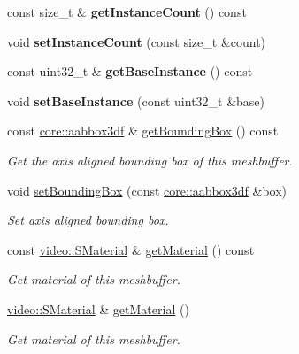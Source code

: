 \begin{DoxyCompactItemize}
\item 
const size\+\_\+t \& {\bfseries get\+Instance\+Count} () const \hypertarget{classirr_1_1scene_1_1IMeshBuffer_ac13655bb7c91e4917c8ed74ba7241414}{}\label{classirr_1_1scene_1_1IMeshBuffer_ac13655bb7c91e4917c8ed74ba7241414}

\item 
void {\bfseries set\+Instance\+Count} (const size\+\_\+t \&count)\hypertarget{classirr_1_1scene_1_1IMeshBuffer_a8358b00737428ad08be25c97188bec65}{}\label{classirr_1_1scene_1_1IMeshBuffer_a8358b00737428ad08be25c97188bec65}

\item 
const uint32\+\_\+t \& {\bfseries get\+Base\+Instance} () const \hypertarget{classirr_1_1scene_1_1IMeshBuffer_a9fea491c3617ce1a4ac0f24a5b0ac8bf}{}\label{classirr_1_1scene_1_1IMeshBuffer_a9fea491c3617ce1a4ac0f24a5b0ac8bf}

\item 
void {\bfseries set\+Base\+Instance} (const uint32\+\_\+t \&base)\hypertarget{classirr_1_1scene_1_1IMeshBuffer_a621584bc5b4a3f7c703a696272441b0a}{}\label{classirr_1_1scene_1_1IMeshBuffer_a621584bc5b4a3f7c703a696272441b0a}

\item 
const \hyperlink{namespaceirr_1_1core_adfc8fa01b30044c55f3332a1d6c1aa19}{core\+::aabbox3df} \& \hyperlink{classirr_1_1scene_1_1IMeshBuffer_a8b8b19540e5d82432acbddb61d05459b}{get\+Bounding\+Box} () const 
\begin{DoxyCompactList}\small\item\em Get the axis aligned bounding box of this meshbuffer. \end{DoxyCompactList}\item 
void \hyperlink{classirr_1_1scene_1_1IMeshBuffer_a6434ba67b31904215afb17b8180e7e66}{set\+Bounding\+Box} (const \hyperlink{namespaceirr_1_1core_adfc8fa01b30044c55f3332a1d6c1aa19}{core\+::aabbox3df} \&box)
\begin{DoxyCompactList}\small\item\em Set axis aligned bounding box. \end{DoxyCompactList}\item 
const \hyperlink{classirr_1_1video_1_1SMaterial}{video\+::\+S\+Material} \& \hyperlink{classirr_1_1scene_1_1IMeshBuffer_a46c154b3cf9730cbc078c1e6ea1b6b18}{get\+Material} () const 
\begin{DoxyCompactList}\small\item\em Get material of this meshbuffer. \end{DoxyCompactList}\item 
\hyperlink{classirr_1_1video_1_1SMaterial}{video\+::\+S\+Material} \& \hyperlink{classirr_1_1scene_1_1IMeshBuffer_a4f4160dbdd5bb5dbfc4b74b5042dc0ec}{get\+Material} ()
\begin{DoxyCompactList}\small\item\em Get material of this meshbuffer. \end{DoxyCompactList}\end{DoxyCompactItemize}

